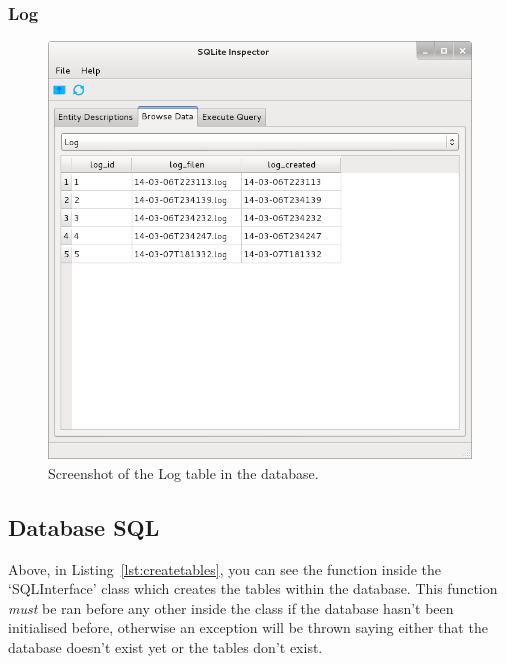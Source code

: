 \documentclass[a4paper]{article}
\begin{document}
        \subsubsection{Log}
            \begin{figure}[H]
                \caption{Screenshot of the Log table in the database.}
                \centering
                \includegraphics[scale=0.5]{../shared_assets/screenshots/database_log.png}
            \end{figure}

        \newpage
        \subsection{Database SQL}

        
        Above, in Listing~\ref{lst:createtables}, you can see the function inside the `SQLInterface' class which creates the tables
        within the database. This function \textit{must} be ran before any other inside the class if the database
        hasn't been initialised before, otherwise an exception will be thrown saying either that the database 
        doesn't exist yet or the tables don't exist.
\end{document}
